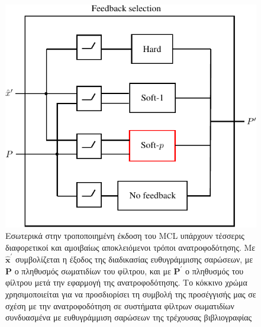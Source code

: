 \begin{figure}\centering
  \includegraphics{./figures/parts/02/chapters/02/sections/03/feedback}
  \caption{\small Εσωτερικά στην τροποποιημένη έκδοση του MCL υπάρχουν τέσσερις
           διαφορετικοί και αμοιβαίως αποκλειόμενοι τρόποι ανατροφοδότησης. Με
           $\hat{\bm{x}}^{\prime}$ συμβολίζεται η έξοδος της διαδικασίας
           ευθυγράμμισης σαρώσεων, με $\bm{P}$ ο πληθυσμός σωματιδίων του
           φίλτρου, και με $\bm{P}^{\prime}$ ο πληθυσμός του φίλτρου μετά την
           εφαρμογή της ανατροφοδότησης. Το κόκκινο χρώμα χρησιμοποιείται για να
           προσδιορίσει τη συμβολή της προσέγγισής μας σε σχέση με την
           ανατροφοδότηση σε συστήματα φίλτρων σωματιδίων συνδυασμένα με
           ευθυγράμμιση σαρώσεων της τρέχουσας βιβλιογραφίας}
  \label{fig:feedback}
\end{figure}

